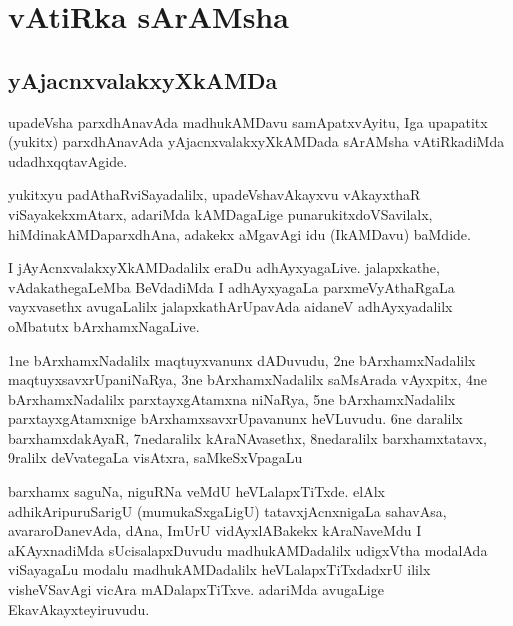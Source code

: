 \chapter{vAtiRka sArAMsha}
\section*{yAjacnxvalakxyXkAMDa}
\centerline{}

\begin{artha}
upadeVsha parxdhAnavAda madhukAMDavu samApatxvAyitu, Iga upapatitx (yukitx) parxdhAnavAda 
yAjacnxvalakxyXkAMDada sArAMsha vAtiRkadiMda udadhxqqtavAgide.

yukitxyu padAthaRviSayadalilx, upadeVshavAkayxvu vAkayxthaR viSayakekxmAtarx, adariMda 
kAMDagaLige punarukitxdoVSavilalx, hiMdinakAMDaparxdhAna, adakekx aMgavAgi idu 
(IkAMDavu) baMdide.  
\end{artha}

\centerline{}

I jAyAcnxvalakxyXkAMDadalilx eraDu adhAyxyagaLive. jalapxkathe, vAdakathegaLeMba BeVdadiMda 
I adhAyxyagaLa parxmeVyAthaRgaLa vayxvasethx avugaLalilx jalapxkathArUpavAda aidaneV 
adhAyxyadalilx oMbatutx bArxhamxNagaLive.

\centerline{}

\begin{artha}
1ne bArxhamxNadalilx maqtuyxvanunx dADuvudu, 2ne bArxhamxNadalilx maqtuyxsavxrUpaniNaRya, 3ne bArxhamxNadalilx saMsArada vAyxpitx, 4ne bArxhamxNadalilx parxtayxgAtamxna niNaRya, 5ne bArxhamxNadalilx parxtayxgAtamxnige bArxhamxsavxrUpavanunx heVLuvudu. 6ne daralilx barxhamxdakAyaR, 7nedaralilx kAraNAvasethx, 8nedaralilx barxhamxtatavx, 9ralilx deVvategaLa visAtxra, saMkeSxVpagaLu 

barxhamx saguNa, niguRNa veMdU heVLalapxTiTxde. elAlx adhikAripuruSarigU (mumukaSxgaLigU) tatavxjAcnxnigaLa sahavAsa, avararoDanevAda, dAna, ImUrU vidAyxlABakekx kAraNaveMdu I aKAyxnadiMda sUcisalapxDuvudu madhukAMDadalilx udigxVtha modalAda viSayagaLu modalu madhukAMDadalilx heVLalapxTiTxdadxrU ililx visheVSavAgi vicAra mADalapxTiTxve. adariMda avugaLige EkavAkayxteyiruvudu.
\end{artha}

